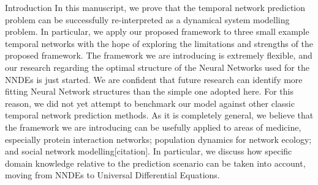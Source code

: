 \documentclass[12pt]{amsart}
\begin{document}
\begin{section}{Introduction}
In this manuscript, we prove that the temporal network prediction problem can be successfully re-interpreted as a dynamical system modelling problem. In particular, we apply our proposed framework to three small example temporal networks with the hope of exploring the limitations and strengths of the proposed framework.
The framework we are introducing is extremely flexible, and our research regarding the optimal structure of the Neural Networks used for the NNDEs is just started.
We are confident that future research can identify more fitting Neural Network structures than the simple one adopted here.
For this reason, we did not yet attempt to benchmark our model against other classic temporal network prediction methods.
As it is completely general, we believe that the framework we are introducing can be usefully applied to areas of medicine, especially protein interaction networks; population dynamics for network ecology; and social network modelling[citation]. In particular, we discuss how specific domain knowledge relative to the prediction scenario can be taken into account, moving from NNDEs to Universal Differential Equations.

\end{section}
\end{document}
